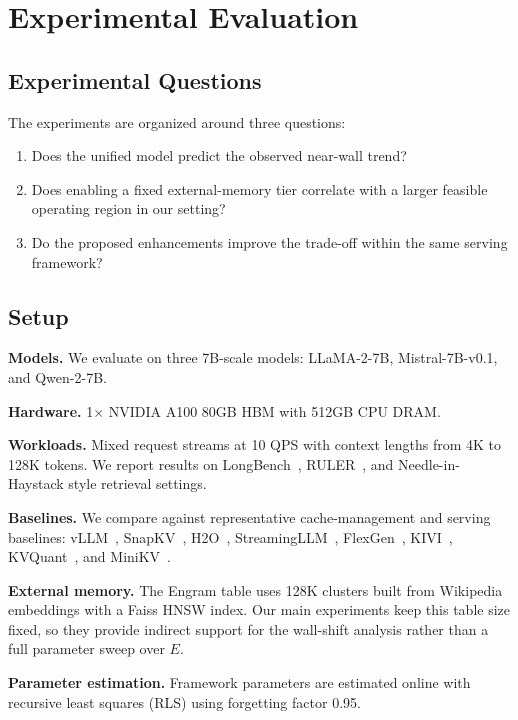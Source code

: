 \documentclass[11pt,a4paper]{article}
\theoremstyle{plain}
\theoremstyle{definition}
\begin{document}
\section{Experimental Evaluation}
\label{sec:experiments}

\subsection{Experimental Questions}
The experiments are organized around three questions:
\begin{enumerate}
    \item Does the unified model predict the observed near-wall trend?
    \item Does enabling a fixed external-memory tier correlate with a larger feasible operating region in our setting?
    \item Do the proposed enhancements improve the trade-off within the same serving framework?
\end{enumerate}

\subsection{Setup}
\textbf{Models.} We evaluate on three 7B-scale models: LLaMA-2-7B, Mistral-7B-v0.1, and Qwen-2-7B.

\textbf{Hardware.} 1$\times$ NVIDIA A100 80GB HBM with 512GB CPU DRAM.

\textbf{Workloads.} Mixed request streams at 10 QPS with context lengths from 4K to 128K tokens. We report results on LongBench~\cite{bai2023longbench}, RULER~\cite{hsieh2024ruler}, and Needle-in-Haystack style retrieval settings.

\textbf{Baselines.} We compare against representative cache-management and serving baselines: vLLM~\cite{kwon2023}, SnapKV~\cite{li2024snapkv}, H2O~\cite{zhang2023h2o}, StreamingLLM~\cite{xiao2024streamingllm}, FlexGen~\cite{sheng2023}, KIVI~\cite{liu2024kivi}, KVQuant~\cite{hooper2024kvquant}, and MiniKV~\cite{sharma2025minikv}.

\textbf{External memory.} The Engram table uses 128K clusters built from Wikipedia embeddings with a Faiss HNSW index. Our main experiments keep this table size fixed, so they provide indirect support for the wall-shift analysis rather than a full parameter sweep over $E$.

\textbf{Parameter estimation.} Framework parameters are estimated online with recursive least squares (RLS) using forgetting factor 0.95.
\end{document}
